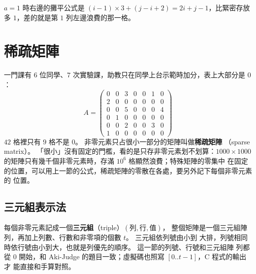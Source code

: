 \begin{center}
\label{fig:arr-band}
\end{center}

$a = 1$ 時右邊的攤平公式是 $(i - 1) \times 3 + (j - i + 2) = 2i + j - 1$，比緊密存放
多 $1$，差的就是第 $1$ 列左邊浪費的那一格。

\section{稀疏矩陣}
\label{sec:arr-sparse}

一門課有 $6$ 位同學、$7$ 次實驗課，助教只在同學上台示範時加分，表上大部分是 $0$：
\[
A = \begin{pmatrix}
0 & 0 & 3 & 0 & 0 & 1 & 0 \\
2 & 0 & 0 & 0 & 0 & 0 & 0 \\
0 & 0 & 5 & 0 & 0 & 0 & 4 \\
0 & 1 & 0 & 0 & 0 & 0 & 0 \\
0 & 0 & 2 & 0 & 0 & 3 & 0 \\
1 & 0 & 0 & 0 & 0 & 0 & 0
\end{pmatrix}
\]
$42$ 格裡只有 $9$ 格不是 $0$。 非零元素只占很小一部分的矩陣叫做\textbf{稀疏矩陣}
（sparse matrix）。 「很小」沒有固定的門檻，看的是只存非零元素划不划算：$1000
\times 1000$ 的矩陣只有幾千個非零元素時，存滿 $10^6$ 格顯然浪費；特殊矩陣的零集中
在固定的位置，可以用上一節的公式，稀疏矩陣的零散在各處，要另外記下每個非零元素的
位置。

\subsection{三元組表示法}

每個非零元素記成一個\textbf{三元組}（triple）$(\text{列}, \text{行}, \text{值})$，
整個矩陣是一個三元組陣列，再加上列數、行數和非零項的個數 $t$。 三元組依列號由小到
大排，列號相同時依行號由小到大，也就是列優先的順序。 這一節的列號、行號和三元組陣
列都從 $0$ 開始，和 Aki-Judge 的題目一致；虛擬碼也照寫 $[0..t-1]$，C 程式的輸出才
能直接和手算對照。

